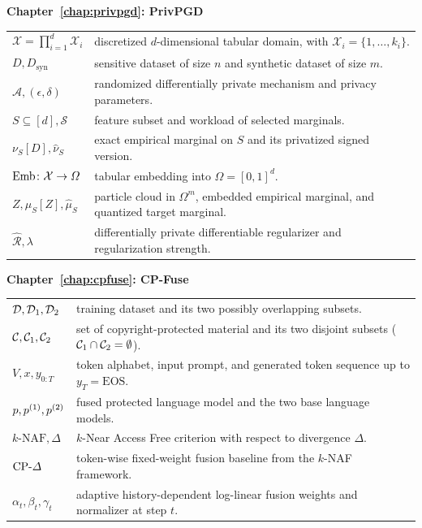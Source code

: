 \medskip
\noindent\textbf{Chapter~\ref{chap:privpgd}: PrivPGD}\par\smallskip
\begin{tabularx}{\textwidth}{lX}
  \(\mathcal{X} = \prod_{i=1}^d \mathcal{X}_i\) & discretized \(d\)-dimensional tabular domain, with \(\mathcal{X}_i = \{1,\dots,k_i\}\). \\
  \(D, D_{\mathrm{syn}}\) & sensitive dataset of size \(n\) and synthetic dataset of size \(m\). \\
  \(\mathcal{A}, (\epsilon,\delta)\) & randomized differentially private mechanism and privacy parameters. \\
  \(S \subseteq [d], \mathcal{S}\) & feature subset and workload of selected marginals. \\
  \(\nu_S[D], \hat{\nu}_S\) & exact empirical marginal on \(S\) and its privatized signed version. \\
  \(\operatorname{Emb}\colon \mathcal{X} \to \Omega\) & tabular embedding into \(\Omega = [0,1]^d\). \\
  \(Z, \mu_S[Z], \hat{\mu}_S\) & particle cloud in \(\Omega^m\), embedded empirical marginal, and quantized target marginal. \\
  \(\hat{\mathcal{R}}, \lambda\) & differentially private differentiable regularizer and regularization strength. \\
\end{tabularx}

\medskip
\noindent\textbf{Chapter~\ref{chap:cpfuse}: CP-Fuse}\par\smallskip
\begin{tabularx}{\textwidth}{lX}
  \(\mathcal D, \mathcal D_1, \mathcal D_2\) & training dataset and its two possibly overlapping subsets. \\
  \(\mathcal C, \mathcal C_1, \mathcal C_2\) & set of copyright-protected material and its two disjoint subsets (\(\mathcal C_1 \cap \mathcal C_2 = \emptyset\)). \\
  \(V, x, y_{0:T}\) & token alphabet, input prompt, and generated token sequence up to \(y_T = \mathrm{EOS}\). \\
  \(p, p^{(1)}, p^{(2)}\) & fused protected language model and the two base language models. \\
  \(k\text{-NAF}, \Delta\) & \(k\)-Near Access Free criterion with respect to divergence \(\Delta\). \\
  \(\text{CP-}\Delta\) & token-wise fixed-weight fusion baseline from the \(k\)-NAF framework. \\
  \(\alpha_t, \beta_t, \gamma_t\) & adaptive history-dependent log-linear fusion weights and normalizer at step \(t\). \\
\end{tabularx}
